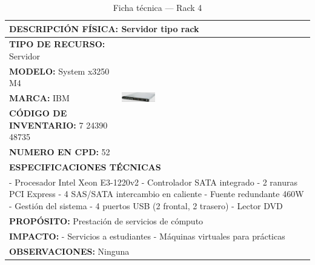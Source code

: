 \begin{table}[H]
\centering
\sffamily\scriptsize
\setlength{\tabcolsep}{3pt}
\renewcommand{\arraystretch}{1.1}
\caption{Ficha técnica --- Rack 4}
\label{tab:rack-4}
\begin{tabular}{|p{}|p{}|}
\hline
\multicolumn{2}{|l|}{\textbf{DESCRIPCIÓN FÍSICA:} Servidor tipo rack} \\ \hline
\textbf{TIPO DE RECURSO:} Servidor & 
\multirow{5}{*}{\includegraphics[width=0.18\textwidth,keepaspectratio]{tablas-images/cp1/racks/rack-1.png}} \\ \cline{1-1}
\textbf{MODELO:} System x3250 M4 & \\ \cline{1-1}
\textbf{MARCA:} IBM & \\ \cline{1-1}
\textbf{CÓDIGO DE INVENTARIO:} 7 24390 48735 & \\ \cline{1-1}
\textbf{NUMERO EN CPD:} 52 & \\ \hline
\multicolumn{2}{|l|}{\textbf{ESPECIFICACIONES TÉCNICAS}} \\ \hline
\multicolumn{2}{|p{0.7\textwidth}|}{
- Procesador Intel Xeon E3-1220v2
- Controlador SATA integrado
- 2 ranuras PCI Express
- 4 SAS/SATA intercambio en caliente
- Fuente redundante 460W
- Gestión del sistema
- 4 puertos USB (2 frontal, 2 trasero)
- Lector DVD
} \\ \hline
\multicolumn{2}{|l|}{\textbf{PROPÓSITO:} Prestación de servicios de cómputo} \\ \hline
\multicolumn{2}{|p{0.7\textwidth}|}{\textbf{IMPACTO:} 
- Servicios a estudiantes
- Máquinas virtuales para prácticas} \\ \hline
\multicolumn{2}{|p{0.7\textwidth}|}{\textbf{OBSERVACIONES:} Ninguna} \\ \hline
\end{tabular}
\end{table}

